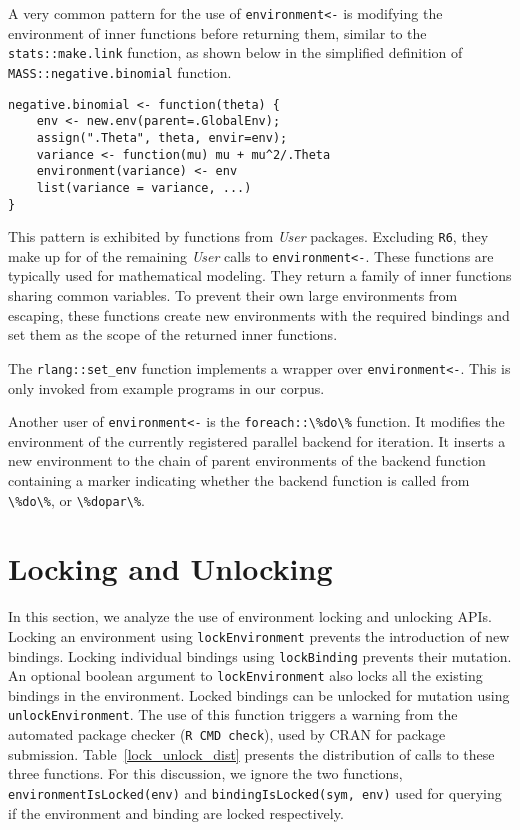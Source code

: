 \documentclass[10pt,review,sigplan,authorversion=true]{acmart}
\renewcommand{\c}[1]{\lstinline |#1|\xspace}
\begin{document}
A very common pattern for the use of \c{environment<-} is modifying the
environment of inner functions before returning them, similar to the
\c{stats::make.link} function, as shown below in the simplified definition of
\c{MASS::negative.binomial} function.

\begin{lstlisting}
negative.binomial <- function(theta) {
    env <- new.env(parent=.GlobalEnv);
    assign(".Theta", theta, envir=env);
    variance <- function(mu) mu + mu^2/.Theta
    environment(variance) <- env
    list(variance = variance, ...)
}

\end{lstlisting}

This pattern is exhibited by \EnvAsnUserInnerFunFunCnt functions from
\EnvAsnUserInnerFunPackCnt \emph{User} packages. Excluding \c{R6}, they make up
for \EnvAsnUserInnerFunCallPerc of the remaining \emph{User} calls to
\c{environment<-}. These functions are typically used for mathematical modeling.
They return a family of inner functions sharing common variables. To prevent
their own large environments from escaping, these functions create new
environments with the required bindings and set them as the scope of the
returned inner functions.

The \c{rlang::set_env} function implements a wrapper over \c{environment<-}.
This is only invoked from example programs in our corpus.

Another user of \c{environment<-} is the \c{foreach::\%do\%} function. It
modifies the environment of the currently registered parallel backend for
iteration. It inserts a new environment to the chain of parent environments of
the backend function containing a marker indicating whether the backend function
is called from \c{\%do\%}, or \c{\%dopar\%}.

\section{Locking and Unlocking}

In this section, we analyze the use of environment locking and unlocking APIs.
Locking an environment using \c{lockEnvironment} prevents the introduction of
new bindings. Locking individual bindings using \c{lockBinding} prevents their
mutation. An optional boolean argument to \c{lockEnvironment} also locks all the
existing bindings in the environment. Locked bindings can be unlocked for
mutation using \c{unlockEnvironment}. The use of this function triggers a
warning from the automated package checker (\c{R CMD check}), used by CRAN for
package submission. Table~\ref{lock_unlock_dist} presents the distribution of
calls to these three functions. For this discussion, we ignore the two
functions, \c{environmentIsLocked(env)} and \c{bindingIsLocked(sym, env)} used
for querying if the environment and binding are locked respectively.
\end{document}
